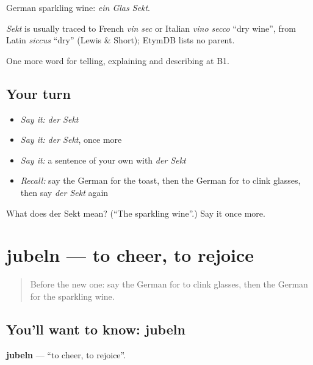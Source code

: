 German sparkling wine: \emph{ein Glas Sekt}.

\begin{cousinweb}
\emph{Sekt} is usually traced to French \emph{vin sec} or Italian \emph{vino secco} \textquotedblleft{}dry wine\textquotedblright{}, from Latin \emph{siccus} \textquotedblleft{}dry\textquotedblright{} (Lewis \& Short); EtymDB lists no parent.
\end{cousinweb}

\begin{grammarlens}[title={What you've built}]
One more word for telling, explaining and describing at B1.
\end{grammarlens}

\subsection*{Your turn}
\begin{itemize}
\raggedright
  \item \emph{Say it:} \emph{der Sekt}
  \item \emph{Say it:} \emph{der Sekt}, once more
  \item \emph{Say it:} a sentence of your own with \emph{der Sekt}
  \item \emph{Recall:} say the German for the toast, then the German for to clink glasses, then say \emph{der Sekt} again
\end{itemize}

\begin{tcolorbox}[breakable,colback=teal!4,colframe=teal!35!black,title={Before you move on}]
What does der Sekt mean? (\textquotedblleft{}The sparkling wine\textquotedblright{}.) Say it once more.
\end{tcolorbox}
\section[jubeln]{jubeln — to cheer, to rejoice}

\label{lesson:GE-C308-jubeln}



\begin{quote}
Before the new one: say the German for to clink glasses, then the German for the sparkling wine.
\end{quote}

\subsection*{You'll want to know: jubeln}
\textbf{jubeln} — \textquotedblleft{}to cheer, to rejoice\textquotedblright{}.

